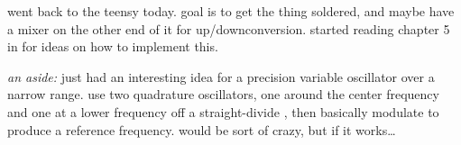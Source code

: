 went back to the teensy \pll today. goal is to get the thing soldered, and
maybe have a mixer on the other end of it for \dsb up/downconversion. started
reading chapter 5 in \autocite{experimental-rf} for ideas on how to implement
this.

\textit{an aside:} just had an interesting idea for a precision variable
oscillator over a narrow range. use two quadrature oscillators, one around the
center frequency and one at a lower frequency off a straight-divide \pll, then
basically \ssb modulate to produce a reference frequency. would be sort of
crazy, but if it works\ldots
